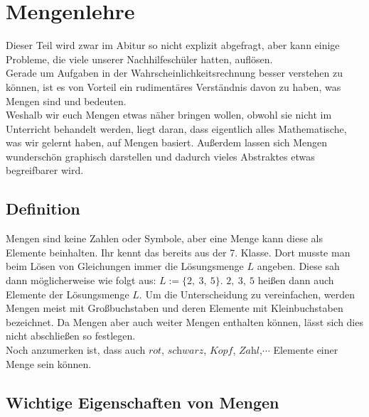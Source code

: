 \section{Mengenlehre}
Dieser Teil wird zwar im Abitur so nicht explizit abgefragt, aber kann einige Probleme, die viele unserer Nachhilfeschüler hatten, auflösen.\\
Gerade um Aufgaben in der Wahrscheinlichkeitsrechnung besser verstehen zu können, ist es von Vorteil ein rudimentäres Verständnis davon zu haben, was Mengen sind und bedeuten.\\
Weshalb wir euch Mengen etwas näher bringen wollen, obwohl sie nicht im Unterricht behandelt werden, liegt daran, dass eigentlich alles Mathematische, was wir gelernt haben, auf Mengen basiert. Außerdem lassen sich Mengen wunderschön graphisch darstellen und dadurch vieles Abstraktes etwas begreifbarer wird.

\subsection{Definition}
Mengen sind keine Zahlen oder Symbole, aber eine Menge kann diese als Elemente beinhalten. Ihr kennt das bereits aus der 7. Klasse. Dort musste man beim Lösen von Gleichungen immer die Lösungsmenge $L$ angeben. Diese sah dann möglicherweise wie folgt aus: $L:=\{2,\ 3,\ 5\}$. $2,\ 3,\ 5$ heißen dann auch Elemente der Lösungsmenge $L$. Um die Unterscheidung zu vereinfachen, werden Mengen meist mit Großbuchstaben und deren Elemente mit Kleinbuchstaben bezeichnet. Da Mengen aber auch weiter Mengen enthalten können, lässt sich dies nicht abschließen so festlegen.\\
Noch anzumerken ist, dass auch $\textit{rot}$, $\textit{schwarz}$, $\textit{Kopf}$, $\textit{Zahl}$,$\cdots$ Elemente einer Menge sein können.\\

\subsection{Wichtige Eigenschaften von Mengen}
